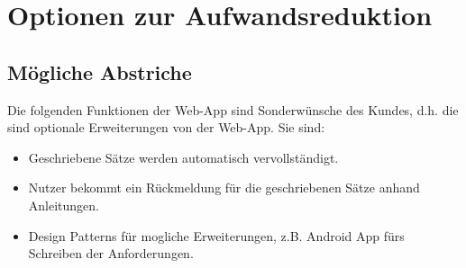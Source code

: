 \section{Optionen zur Aufwandsreduktion}

	\subsection{Mögliche Abstriche}
	Die folgenden Funktionen der Web-App sind Sonderwünsche des Kundes, d.h. die sind optionale Erweiterungen von der Web-App. Sie sind:
	\begin{itemize}
		\item Geschriebene Sätze werden automatisch vervollständigt.
		\item Nutzer bekommt ein Rückmeldung für die geschriebenen Sätze anhand Anleitungen.
		\item Design Patterns für mogliche Erweiterungen, z.B. Android App fürs Schreiben der Anforderungen.
	\end{itemize}
	
